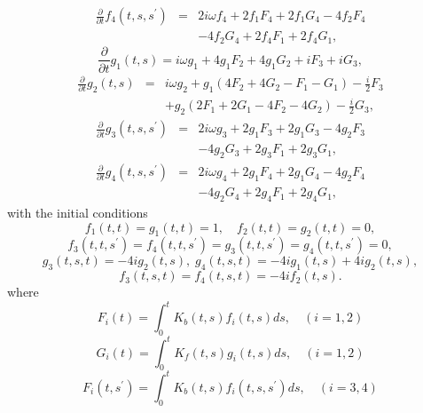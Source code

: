 \documentclass[preprint]{elsarticle}
\begin{document}
\begin{eqnarray}
\frac{\partial}{\partial t}f_{4}(t,s,s^{\prime}) & = & 2i\omega f_{4}+2f_{1}F_{4}+2f_{1}G_{4}-4f_{2}F_{4}\nonumber \\
 &  & -4f_{2}G_{4}+2f_{4}F_{1}+2f_{4}G_{1},
\end{eqnarray}
\begin{equation}
\frac{\partial}{\partial t}g_{1}(t,s)=i\omega g_{1}+4g_{1}F_{2}+4g_{1}G_{2}+iF_{3}+iG_{3},
\end{equation}
\begin{eqnarray}
\frac{\partial}{\partial t}g_{2}(t,s) & = & i\omega g_{2}+g_{1}(4F_{2}+4G_{2}-F_{1}-G_{1})-\frac{i}{2}F_{3}\nonumber \\
 &  & +g_{2}(2F_{1}+2G_{1}-4F_{2}-4G_{2})-\frac{i}{2}G_{3},
\end{eqnarray}
\begin{eqnarray}
\frac{\partial}{\partial t}g_{3}(t,s,s^{\prime}) & = & 2i\omega g_{3}+2g_{1}F_{3}+2g_{1}G_{3}-4g_{2}F_{3}\nonumber \\
 &  & -4g_{2}G_{3}+2g_{3}F_{1}+2g_{3}G_{1},
\end{eqnarray}
\begin{eqnarray}
\frac{\partial}{\partial t}g_{4}(t,s,s^{\prime}) & = & 2i\omega g_{4}+2g_{1}F_{4}+2g_{1}G_{4}-4g_{2}F_{4}\nonumber \\
 &  & -4g_{2}G_{4}+2g_{4}F_{1}+2g_{4}G_{1},
\end{eqnarray}
with the initial conditions
\begin{equation}
f_{1}(t,t)=g_{1}(t,t)=1,\quad f_{2}(t,t)=g_{2}(t,t)=0,
\end{equation}
\begin{equation}
f_{3}(t,t,s^{\prime})=f_{4}(t,t,s^{\prime})=g_{3}(t,t,s^{\prime})=g_{4}(t,t,s^{\prime})=0,
\end{equation}
\begin{equation}
g_{3}(t,s,t)=-4ig_{2}(t,s),\; g_{4}(t,s,t)=-4ig_{1}(t,s)+4ig_{2}(t,s),
\end{equation}
\begin{equation}
f_{3}(t,s,t)=f_{4}(t,s,t)=-4if_{2}(t,s).
\end{equation}
where
\begin{equation}
F_{i}(t)=\int_{0}^{t}K_{b}(t,s)f_{i}(t,s)ds,\quad(i=1,2)
\end{equation}
\begin{equation}
G_{i}(t)=\int_{0}^{t}K_{f}(t,s)g_{i}(t,s)ds,\quad(i=1,2)
\end{equation}
\begin{equation}
F_{i}(t,s^{\prime})=\int_{0}^{t}K_{b}(t,s)f_{i}(t,s,s^{\prime})ds,\quad(i=3,4)
\end{equation}
\end{document}
